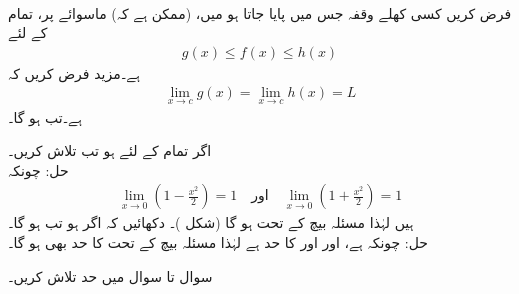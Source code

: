 \\
فرض کریں کسی کھلے وقفہ جس میں  پایا جاتا ہو میں،  (ممکن ہے کہ) ماسوائے  پر،  تمام  کے لئے
\begin{align*}
g(x)\le f(x)\le h(x)
\end{align*}
ہے۔مزید فرض کریں کہ 
\begin{align*}
\lim_{x\to c} g(x)=\lim_{x\to c}h(x)=L
\end{align*}
ہے۔تب  ہو گا۔

اگر تمام  کے لئے  ہو تب  تلاش کریں۔\\
حل:\quad
چونکہ
\begin{align*}
\lim_{x\to 0} (1-\tfrac{x^2}{2})=1\quad \text{اور}\quad \lim_{x\to 0} (1+\tfrac{x^2}{2})=1
\end{align*}
ہیں لہٰذا مسئلہ بیچ کے تحت  ہو گا (شکل )۔
دکھائیں کہ اگر  ہو تب  ہو گا۔\\
حل:\quad
چونکہ  ہے، اور  اور  کا حد  ہے لہٰذا مسئلہ بیچ کے تحت  کا حد بھی  ہو گا۔ 


سوال  تا سوال  میں حد تلاش کریں۔

